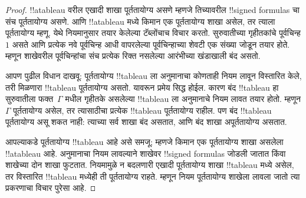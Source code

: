 \documentclass[../../../include/open-logic-section]{subfiles}
\begin{document}
\begin{proof}
!!a{tableau} वरील एखादी शाखा पूर्ततायोग्य असणे म्हणजे
तिच्यावरील !!{signed formula}s चा संच पूर्ततायोग्य असणे.
आणि !!a{tableau} मध्ये किमान एक पूर्ततायोग्य शाखा
असेल, तर त्याला पूर्ततायोग्य म्हणू.
येथे नियमानुसार तयार केलेल्या टॅब्लोंचाच विचार करतो. सुरुवातीच्या
गृहीतकांचे पूर्वचिन्ह $1$ असते आणि प्रत्येक नवे पूर्वचिन्ह आधी
वापरलेल्या पूर्वचिन्हाच्या शेवटी एक संख्या जोडून तयार होते.
म्हणून शाखेवरील पूर्वचिन्हांचा संच प्रत्येक रिक्त नसलेल्या आरंभीच्या
खंडाखाली बंद असतो.

आपण पुढील विधान दाखवू: पूर्ततायोग्य !!{tableau} ला
अनुमानाचा कोणताही नियम लावून विस्तारित केले, तरी
मिळणारा !!{tableau} पूर्ततायोग्य असतो. यावरून प्रमेय
सिद्ध होईल. कारण बंद !!{tableau} हा
सुरुवातीला फक्त~$\Gamma$ मधील गृहीतके असलेल्या
!!{tableau} ला अनुमानाचे नियम लावत तयार होतो.
म्हणून $\Gamma$ पूर्ततायोग्य असेल, तर त्यासाठीचा
प्रत्येक !!{tableau} पूर्ततायोग्य राहील. पण बंद
!!{tableau} पूर्ततायोग्य असू शकत नाही: त्याच्या सर्व
शाखा बंद असतात, आणि बंद शाखा अपूर्ततायोग्य असतात.

आपल्याकडे पूर्ततायोग्य !!{tableau} आहे असे समजू;
म्हणजे किमान एक पूर्ततायोग्य शाखा असलेला !!a{tableau}
आहे. अनुमानाचा
नियम लावल्याने शाखेवर !!{signed formula}s
जोडली जातात किंवा शाखेच्या दोन शाखा फुटतात.
नियमामुळे न बदलणारी एखादी पूर्ततायोग्य शाखा
!!{tableau} मध्ये असेल, तर विस्तारित
!!{tableau} मध्येही ती पूर्ततायोग्य राहते. म्हणून
नियम पूर्ततायोग्य शाखेला लावला जातो त्या
प्रकरणाचा विचार पुरेसा आहे.


\end{proof}
\end{document}

